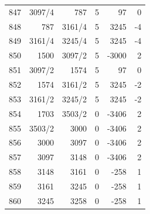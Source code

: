 \documentclass[11pt,a4paper]{article}
\begin{document}
\begin{minipage}[t]{.49\linewidth}
\begin{tabular*}{\linewidth}{@{}r@{\extracolsep{\fill}}rrrrr@{}}
847 & 3097/4 & 787 & 5 & 97 & 0\\
848 & 787 & 3161/4 & 5 & 3245 & -4\\
849 & 3161/4 & 3245/4 & 5 & 3245 & -4\\
850 & 1500 & 3097/2 & 5 & -3000 & 2\\
851 & 3097/2 & 1574 & 5 & 97 & 0\\
852 & 1574 & 3161/2 & 5 & 3245 & -2\\
853 & 3161/2 & 3245/2 & 5 & 3245 & -2\\
854 & 1703 & 3503/2 & 0 & -3406 & 2\\
855 & 3503/2 & 3000 & 0 & -3406 & 2\\
856 & 3000 & 3097 & 0 & -3406 & 2\\
857 & 3097 & 3148 & 0 & -3406 & 2\\
858 & 3148 & 3161 & 0 & -258 & 1\\
859 & 3161 & 3245 & 0 & -258 & 1\\
860 & 3245 & 3258 & 0 & -258 & 1\\
\bottomrule\end{tabular*}\end{minipage}\par
\iffalse
\end{document}
